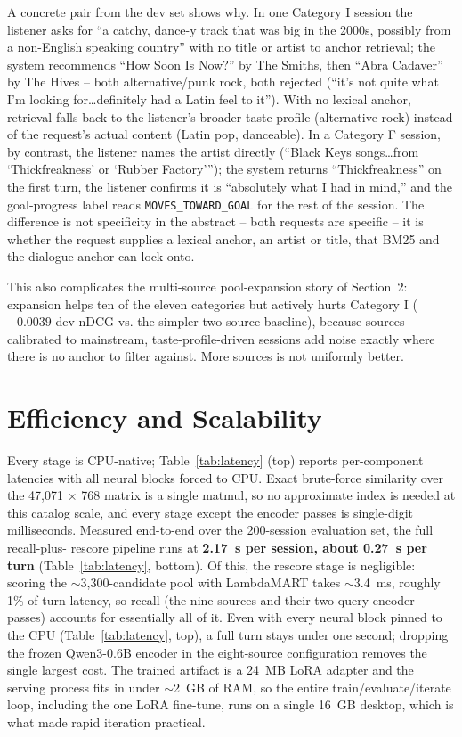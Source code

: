 \documentclass[sigconf]{acmart}
\begin{document}
A concrete pair from the dev set shows why. In one Category I session the
listener asks for ``a catchy, dance-y track that was big in the 2000s,
possibly from a non-English speaking country'' with no title or artist to
anchor retrieval; the system recommends ``How Soon Is Now?'' by The Smiths,
then ``Abra Cadaver'' by The Hives -- both alternative/punk rock, both
rejected (``it's not quite what I'm looking for\ldots definitely had a Latin
feel to it''). With no lexical anchor, retrieval falls back to the
listener's broader taste profile (alternative rock) instead of the
request's actual content (Latin pop, danceable). In a Category F session,
by contrast, the listener names the artist directly (``Black Keys
songs\ldots from `Thickfreakness' or `Rubber Factory'''); the system
returns ``Thickfreakness'' on the first turn, the listener confirms it is
``absolutely what I had in mind,'' and the goal-progress label reads
\texttt{MOVES\_TOWARD\_GOAL} for the rest of the session. The difference is
not specificity in the abstract -- both requests are specific -- it is
whether the request supplies a lexical anchor, an artist or title, that
BM25 and the dialogue anchor can lock onto.

This also complicates the multi-source pool-expansion story of
Section~2: expansion helps ten of the eleven categories but actively hurts
Category I ($-0.0039$ dev nDCG vs. the simpler two-source baseline),
because sources calibrated to mainstream, taste-profile-driven sessions add
noise exactly where there is no anchor to filter against. More sources is
not uniformly better.

\section{Efficiency and Scalability}

Every stage is CPU-native; Table~\ref{tab:latency} (top) reports per-component latencies with all
neural blocks forced to CPU. Exact brute-force similarity over the 47,071 $\times$ 768
matrix is a single matmul, so no approximate index is needed at this catalog
scale, and every stage except the encoder passes is single-digit milliseconds.
Measured end-to-end over the 200-session evaluation set, the full recall-plus-
rescore pipeline runs at \textbf{2.17~s per session, about 0.27~s per turn} (Table~\ref{tab:latency},
bottom). Of this, the rescore stage is negligible: scoring the $\sim$3,300-candidate
pool with LambdaMART takes $\sim$3.4~ms, roughly 1\% of turn latency, so recall (the nine
sources and their two query-encoder passes) accounts for essentially all of it.
Even with every neural block pinned to the CPU (Table~\ref{tab:latency}, top), a full turn stays
under one second; dropping the frozen Qwen3-0.6B encoder in the eight-source
configuration removes the single largest cost. The trained artifact is a 24~MB
LoRA adapter and the serving process fits in under $\sim$2~GB of RAM, so the entire
train/evaluate/iterate loop, including the one LoRA fine-tune, runs on a single
16~GB desktop, which is what made rapid iteration practical.
\end{document}

